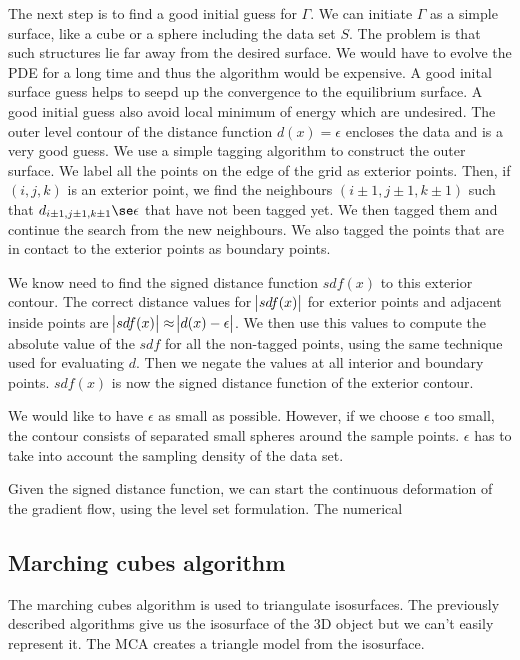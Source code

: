 \documentclass[a4paper]{article}
\begin{document}
The next step is to find a good initial guess for $\Gamma$. We can initiate $\Gamma$ as a simple surface, like a cube or a sphere including the data set $S$. The problem is that such structures lie far away from the desired surface. We would have to evolve the PDE for a long time and thus the algorithm would be expensive. A good inital surface guess helps to seepd up the convergence to the equilibrium surface. A good initial guess also avoid local minimum of energy which are undesired. The outer level contour of the distance function $d(x) = \epsilon$ encloses the data and is a very good guess. We use a simple tagging algorithm to construct the outer surface. We label all the points on the edge of the grid as exterior points. Then, if $(i,j,k)$ is an exterior point, we find the neighbours $(i\pm 1,j\pm 1,k\pm 1)$ such that $d_{i\pm 1,j\pm 1,k\pm 1} \se \epsilon$ that have not been tagged yet. We then tagged them and continue the search from the new neighbours. We also tagged the points that are in contact to the exterior points as boundary points.

We know need to find the signed distance function $sdf(x)$ to this exterior contour. The correct distance values for $\abs{sdf(x)}$ for exterior points and adjacent inside points are $\abs{sdf(x)} \approx \abs{d(x) - \epsilon}$. We then use this values to compute the absolute value of the $sdf$ for all the non-tagged points, using the same technique used for evaluating $d$. Then we negate the values at all interior and boundary points. $sdf(x)$ is now the signed distance function of the exterior contour.

We would like to have $\epsilon$ as small as possible. However, if we choose $\epsilon$ too small, the contour consists of separated small spheres around the sample points. $\epsilon$ has to take into account the sampling density of the data set.

Given the signed distance function, we can start the continuous deformation of the gradient flow, using the level set formulation. The numerical %

\subsection{Marching cubes algorithm}
\label{subsec:mca}
The marching cubes algorithm is used to triangulate isosurfaces. The previously described algorithms give us the isosurface of the 3D object but we can't easily represent it. The MCA creates a triangle model from the isosurface.
\end{document}
